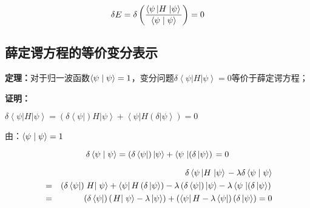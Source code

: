 \begin{equation}\label{23-3}
\delta E = \delta \left( {\frac{{\left\langle {\psi \left| H \right.\left| \psi  \right\rangle } \right.}}{{\left\langle {\psi }
 \mathrel{\left | {\vphantom {\psi  \psi }}
 \right. \kern-\nulldelimiterspace}
 {\psi } \right\rangle }}} \right) = 0
\end{equation}

\subsection{薛定谔方程的等价变分表示}

\textbf{定理：}对于归一波函数$\left\langle {\psi }
 \mathrel{\left | {\vphantom {\psi  \psi }}
 \right. \kern-\nulldelimiterspace}
 {\psi } \right\rangle  = 1$，变分问题$\delta \left\langle {\psi \left| H \right.\left| \psi  \right\rangle } \right. = 0$等价于薛定谔方程；

\textbf{证明：}

$\delta \left\langle {\psi \left| H \right.\left| \psi  \right\rangle } \right. = \left( {\delta \left\langle \psi  \right|} \right)\left. H \right|\left. \psi  \right\rangle  + \left\langle \psi  \right|H\left( {\delta \left| \psi  \right\rangle } \right) = 0$

由：$\left\langle {\psi }
 \mathrel{\left | {\vphantom {\psi  \psi }}
 \right. \kern-\nulldelimiterspace}
 {\psi } \right\rangle  = 1$

\begin{equation*}
\delta \left\langle {\psi }
 \mathrel{\left | {\vphantom {\psi  \psi }}
 \right. \kern-\nulldelimiterspace}
 {\psi } \right\rangle  = \left( {\delta \left\langle \psi  \right|} \right)\left| \psi  \right\rangle  + \left\langle \psi  \right.\left| {\left( {\delta \left| \psi  \right\rangle } \right)} \right. = 0
\end{equation*}

\begin{eqnarray*}
{} &{}& \delta \left\langle {\psi \left| H \right.\left| \psi  \right\rangle } \right. - \lambda \delta \left\langle {\psi }
 \mathrel{\left | {\vphantom {\psi  \psi }}
 \right. \kern-\nulldelimiterspace}
 {\psi } \right\rangle  \\
{} & = & \left( {\delta \left\langle \psi  \right|} \right)\left. H \right|\left. \psi  \right\rangle  + \left\langle \psi  \right|H\left( {\delta \left| \psi  \right\rangle } \right) - \lambda \left( {\delta \left\langle \psi  \right|} \right)\left| \psi  \right\rangle  - \lambda \left\langle \psi  \right.\left| {\left( {\delta \left| \psi  \right\rangle } \right)} \right. \\
{} & = & \left( {\delta \left\langle \psi  \right|} \right)\left( {\left. H \right|\left. \psi  \right\rangle  - \lambda \left| \psi  \right\rangle } \right) + \left( {\left\langle \psi  \right|H - \lambda \left\langle \psi  \right|} \right)\left( {\delta \left| \psi  \right\rangle } \right) = 0 
\end{eqnarray*}

